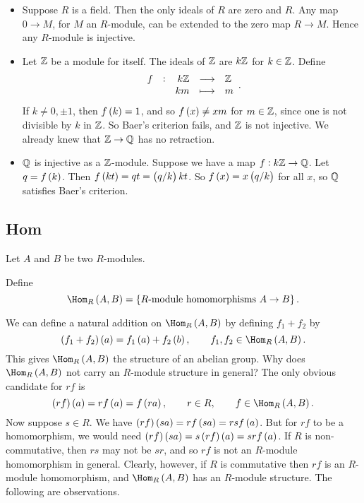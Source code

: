 \begin{example*}
\hfill
\begin{itemize}
\item Suppose $ R $ is a field. Then the only ideals of $ R $ are zero and $ R $. Any map $ 0 \to M $, for $ M $ an $ R $-module, can be extended to the zero map $ R \to M $. Hence any $ R $-module is injective.
\item Let $ \mathbb{Z} $ be a module for itself. The ideals of $ \mathbb{Z} $ are $ k\mathbb{Z} $ for $ k \in \mathbb{Z} $. Define
$$ \function[f]{k\ZZ}{\ZZ}{km}{m}. $$
If $ k \ne 0, \pm 1 $, then $ f\br{k} = 1 $, and so $ f\br{x} \ne xm $ for $ m \in \mathbb{Z} $, since one is not divisible by $ k $ in $ \mathbb{Z} $. So Baer's criterion fails, and $ \mathbb{Z} $ is not injective. We already knew that $ \mathbb{Z} \to \mathbb{Q} $ has no retraction.
\item $ \mathbb{Q} $ is injective as a $ \mathbb{Z} $-module. Suppose we have a map $ f : k\mathbb{Z} \to \mathbb{Q} $. Let $ q = f\br{k} $. Then $ f\br{kt} = qt = \br{q / k}kt $. So $ f\br{x} = x\br{q / k} $ for all $ x $, so $ \mathbb{Q} $ satisfies Baer's criterion.
\end{itemize}
\end{example*}

\pagebreak

\subsection{Hom}


Let $ A $ and $ B $ be two $ R $-modules.

\begin{definition}
Define
$$ \Hom_R\br{A, B} = \cbr{\text{$ R $-module homomorphisms} \ A \to B}. $$
\end{definition}

We can define a natural addition on $ \Hom_R\br{A, B} $ by defining $ f_1 + f_2 $ by
$$ \br{f_1 + f_2}\br{a} = f_1\br{a} + f_2\br{b}, \qquad f_1, f_2 \in \Hom_R\br{A, B}. $$
This gives $ \Hom_R\br{A, B} $ the structure of an abelian group. Why does $ \Hom_R\br{A, B} $ not carry an $ R $-module structure in general? The only obvious candidate for $ rf $ is
$$ \br{rf}\br{a} = rf\br{a} = f\br{ra}, \qquad r \in R, \qquad f \in \Hom_R\br{A, B}. $$
Now suppose $ s \in R $. We have $ \br{rf}\br{sa} = rf\br{sa} = rsf\br{a} $. But for $ rf $ to be a homomorphism, we would need $ \br{rf}\br{sa} = s\br{rf}\br{a} = srf\br{a} $. If $ R $ is non-commutative, then $ rs $ may not be $ sr $, and so $ rf $ is not an $ R $-module homomorphism in general. Clearly, however, if $ R $ is commutative then $ rf $ is an $ R $-module homomorphism, and $ \Hom_R\br{A, B} $ has an $ R $-module structure. The following are observations.

